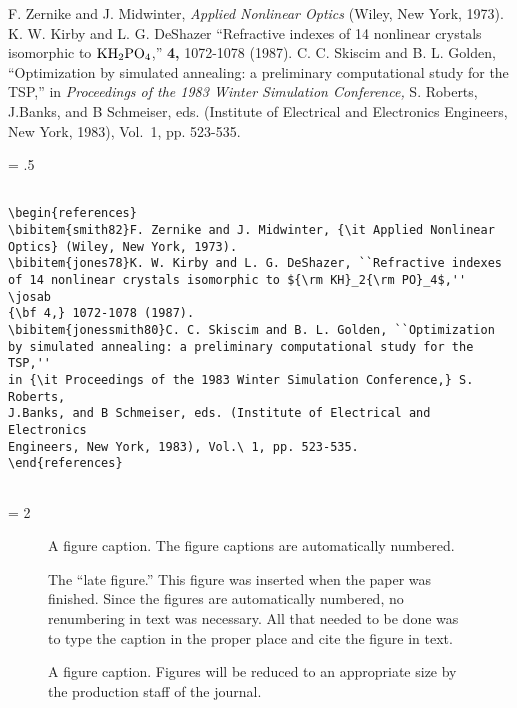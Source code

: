 \begin{references}
F. Zernike and J. Midwinter, {\it Applied Nonlinear
Optics} (Wiley, New York, 1973).
K. W. Kirby and L. G. DeShazer ``Refractive indexes
of 14 nonlinear crystals isomorphic to ${\rm KH}_2{\rm PO}_4$,'' \josab
{\bf 4,} 1072-1078 (1987).
C. C. Skiscim and B. L. Golden, ``Optimization
by simulated annealing: a preliminary computational study for the TSP,''
in {\it Proceedings of the 1983 Winter Simulation Conference,} S. Roberts,
J.Banks, and B Schmeiser, eds. (Institute of Electrical and Electronics
Engineers, New York, 1983), Vol.\ 1, pp. 523-535.
\end{references}

\newpage
\baselineskip = .5\baselineskip  %
\begin{verbatim}

\begin{references}
\bibitem{smith82}F. Zernike and J. Midwinter, {\it Applied Nonlinear
Optics} (Wiley, New York, 1973).
\bibitem{jones78}K. W. Kirby and L. G. DeShazer, ``Refractive indexes
of 14 nonlinear crystals isomorphic to ${\rm KH}_2{\rm PO}_4$,'' \josab
{\bf 4,} 1072-1078 (1987).
\bibitem{jonessmith80}C. C. Skiscim and B. L. Golden, ``Optimization
by simulated annealing: a preliminary computational study for the TSP,''
in {\it Proceedings of the 1983 Winter Simulation Conference,} S. Roberts,
J.Banks, and B Schmeiser, eds. (Institute of Electrical and Electronics
Engineers, New York, 1983), Vol.\ 1, pp. 523-535.
\end{references}


\end{verbatim} \newpage
\baselineskip = 2\baselineskip  %


\begin{figure}
\caption{A figure caption.  The figure captions are automatically
numbered.\label{autonum}}
\end{figure}

\begin{figure}
\caption{The ``late figure.'' This figure was inserted when the paper
was finished.  Since the figures are automatically numbered,
no renumbering in text was necessary. All that
needed to be done was to type the caption in the
proper place and cite the figure in text.\label{latefigure}}
\end{figure}

\begin{figure}
\caption{A figure caption. Figures will be reduced to an appropriate
size by  the production staff of the journal.\label{reduced}}
\end{figure}

